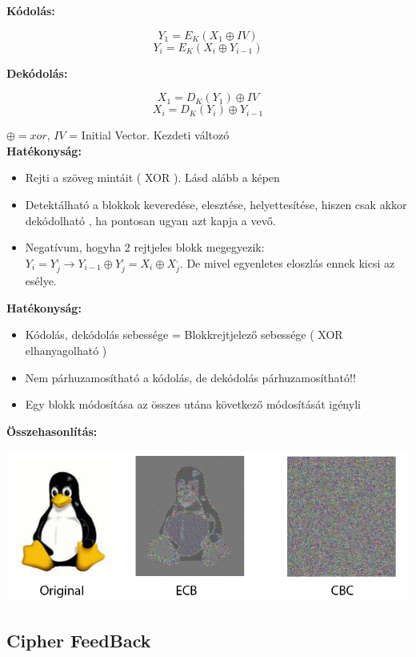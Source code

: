 \textbf{Kódolás:}

	$$Y_1 = E_K(X_1 \oplus IV) $$
	$$Y_i = E_K(X_i \oplus Y_{i-1})$$

\textbf{Dekódolás: }

	$$X_1 = D_K(Y_1) \oplus IV$$
	$$X_i = D_K(Y_i) \oplus Y_{i-1}$$

$\oplus = xor$, $IV$ = Initial Vector. Kezdeti változó\\[2pt]

\textbf{Hatékonyság:}
	\begin{itemize}
		\item Rejti a szöveg mintáit ( XOR ). Lásd alább a képen
		\item Detektálható a blokkok keveredése, elesztése, helyettesítése, hiszen csak akkor dekódolható , ha pontosan ugyan azt kapja a vevő.
		\item Negatívum, hogyha 2 rejtjeles blokk megegyezik: $Y_i = Y^{,}_j \rightarrow Y_{i-1} \oplus Y^{,}_j = X_i \oplus X^{,}_j.$ De mivel egyenletes eloszlás ennek kicsi az esélye.
	\end{itemize}

\textbf{Hatékonyság:}
	\begin{itemize}
		\item Kódolás, dekódolás sebessége = Blokkrejtjelező sebessége ( XOR elhanyagolható )
		\item Nem párhuzamosítható a kódolás, de dekódolás párhuzamosítható!!
		\item Egy blokk módosítása az összes utána következő módosítását igényli
	\end{itemize}

\begin{center}
\textbf{Összehasonlítás:}
	\begin{center}
		\includegraphics[scale=0.5]{img/ECBCBC}
	\end{center}
\end{center}


\subsection{Cipher FeedBack}

